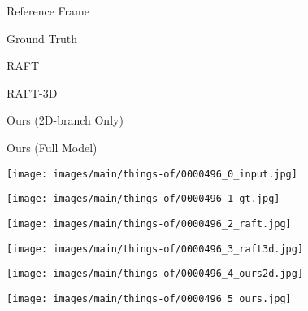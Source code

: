 \documentclass[10pt,twocolumn,letterpaper]{article}
\begin{document}
\begin{figure*}
    \captionsetup[subfigure]{labelformat=empty}
    
\begin{subfigure}[b]{0.165\linewidth}
        \caption{Reference Frame}
    \end{subfigure}\hfill
    \begin{subfigure}[b]{0.165\linewidth}
        \caption{Ground Truth}
    \end{subfigure}\hfill
    \begin{subfigure}[b]{0.165\linewidth}
        \caption{RAFT}
    \end{subfigure}\hfill
    \begin{subfigure}[b]{0.165\linewidth}
        \caption{RAFT-3D}
    \end{subfigure}\hfill
    \begin{subfigure}[b]{0.165\linewidth}
        \caption{Ours (2D-branch Only)}
    \end{subfigure}\hfill
    \begin{subfigure}[b]{0.165\linewidth}
        \caption{Ours (Full Model)}
    \end{subfigure}\hfill
    
    \vspace{-3pt}
    \begin{subfigure}[b]{0.165\linewidth}
        \texttt{[image: images/main/things-of/0000496\_0\_input.jpg]}
    \end{subfigure}\hfill
    \begin{subfigure}[b]{0.165\linewidth}
        \texttt{[image: images/main/things-of/0000496\_1\_gt.jpg]}
    \end{subfigure}\hfill
    \begin{subfigure}[b]{0.165\linewidth}
        \texttt{[image: images/main/things-of/0000496\_2\_raft.jpg]}
    \end{subfigure}\hfill
    \begin{subfigure}[b]{0.165\linewidth}
        \texttt{[image: images/main/things-of/0000496\_3\_raft3d.jpg]}
    \end{subfigure}\hfill
    \begin{subfigure}[b]{0.165\linewidth}
        \texttt{[image: images/main/things-of/0000496\_4\_ours2d.jpg]}
    \end{subfigure}\hfill
    \begin{subfigure}[b]{0.165\linewidth}
        \texttt{[image: images/main/things-of/0000496\_5\_ours.jpg]}
    \end{subfigure}\hfill


\end{figure*}
\end{document}
